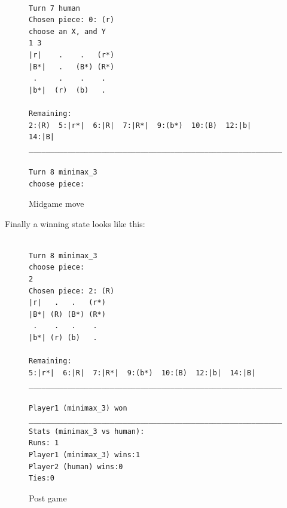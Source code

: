 \documentclass[12pt, a4paper]{article}
\begin{document}
\begin{figure}[H]
\begin{verbatim}

Turn 7 human
Chosen piece: 0: (r)
choose an X, and Y
1 3
|r|    .    .   (r*)
|B*|   .   (B*) (R*)
 .     .    .    . 
|b*|  (r)  (b)   . 

Remaining:
2:(R)  5:|r*|  6:|R|  7:|R*|  9:(b*)  10:(B)  12:|b|  14:|B|  
____________________________________________________________

Turn 8 minimax_3
choose piece:
\end{verbatim}
\caption{Midgame move}
\label{figure2}
\end{figure}
\noindent
Finally a winning state looks like this:\\
\begin{figure}[H]
\begin{verbatim}

Turn 8 minimax_3
choose piece:
2
Chosen piece: 2: (R)
|r|   .   .   (r*)
|B*| (R) (B*) (R*)
 .    .   .    . 
|b*| (r) (b)   . 

Remaining:
5:|r*|  6:|R|  7:|R*|  9:(b*)  10:(B)  12:|b|  14:|B|  
____________________________________________________________

Player1 (minimax_3) won
____________________________________________________________
Stats (minimax_3 vs human):
Runs: 1
Player1 (minimax_3) wins:1
Player2 (human) wins:0
Ties:0

\end{verbatim}
\caption{Post game}
\label{figure3}
\end{figure}
\end{document}
